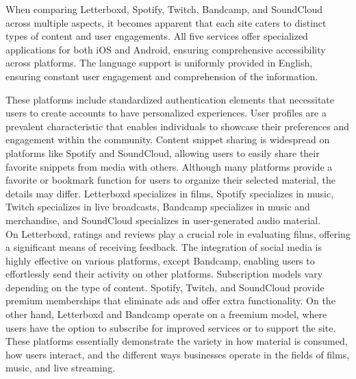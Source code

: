 When comparing Letterboxd, Spotify, Twitch, Bandcamp, and SoundCloud across multiple aspects, it becomes apparent that each site caters to distinct types of content and user engagements. All five services offer specialized applications for both iOS and Android, ensuring comprehensive accessibility across platforms. The language support is uniformly provided in English, ensuring constant user engagement and comprehension of the information. \pagebreak

These platforms include standardized authentication elements that necessitate users to create accounts to have personalized experiences. User profiles are a prevalent characteristic that enables individuals to showcase their preferences and engagement within the community. Content snippet sharing is widespread on platforms like Spotify and SoundCloud, allowing users to easily share their favorite snippets from media with others. Although many platforms provide a favorite or bookmark function for users to organize their selected material, the details may differ. Letterboxd specializes in films, Spotify specializes in music, Twitch specializes in live broadcasts, Bandcamp specializes in music and merchandise, and SoundCloud specializes in user-generated audio material. \\

On Letterboxd, ratings and reviews play a crucial role in evaluating films, offering a significant means of receiving feedback. The integration of social media is highly effective on various platforms, except Bandcamp, enabling users to effortlessly send their activity on other platforms. Subscription models vary depending on the type of content. Spotify, Twitch, and SoundCloud provide premium memberships that eliminate ads and offer extra functionality. On the other hand, Letterboxd and Bandcamp operate on a freemium model, where users have the option to subscribe for improved services or to support the site. These platforms essentially demonstrate the variety in how material is consumed, how users interact, and the different ways businesses operate in the fields of films, music, and live streaming. \pagebreak


